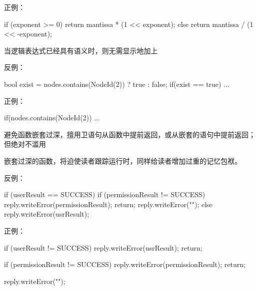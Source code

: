 \begin{content}
正例：
\begin{leftbar}
\begin{c++}
if (exponent >= 0)
{
    return mantissa * (1 << exponent);
}
else
{
    return mantissa / (1 << -exponent);
}
\end{c++}
\end{leftbar}

\begin{regulation}
当逻辑表达式已经具有语义时，则无需显示地加上
\end{regulation}

反例：
\begin{leftbar}
\begin{c++}
bool exist = nodes.contains(NodeId(2)) ? true : false;
if(exist == true)
{
    ...
}
\end{c++}
\end{leftbar}

正例：
\begin{leftbar}
\begin{c++}
if(nodes.contains(NodeId(2))
{
    ...
}
\end{c++}
\end{leftbar}

\begin{regulation}
避免函数嵌套过深，擅用卫语句从函数中提前返回，或从嵌套的语句中提前返回；但绝对不滥用
\end{regulation}

嵌套过深的函数，将迫使读者跟踪运行时，同样给读者增加过重的记忆包袱。

反例：
\begin{leftbar}
\begin{c++}
if (userResult == SUCCESS)
{
    if (permissionResult != SUCCESS)
    {
        reply.writeError(permissionResult);
        return;
    }
    reply.writeError("");
}
else
{
    reply.writeError(usrResult);
}
\end{c++}
\end{leftbar}

正例：
\begin{leftbar}
\begin{c++}
if (userResult != SUCCESS)
{
    reply.writeError(usrResult);
    return;
}

if (permissionResult != SUCCESS)
{
    reply.writeError(permissionResult);
    return;
}

reply.writeError("");

\end{c++}
\end{leftbar}


\end{content}
